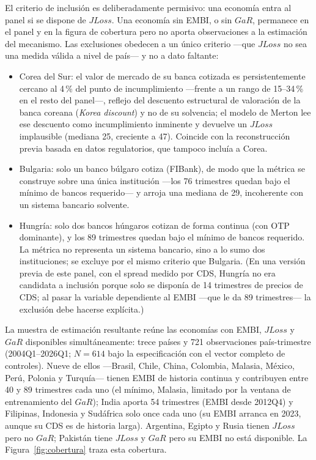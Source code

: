 El criterio de inclusión es deliberadamente permisivo: una economía entra al panel si se dispone de $JLoss$. Una economía sin EMBI, o sin $GaR$, permanece en el panel y en la figura de cobertura pero no aporta observaciones a la estimación del mecanismo. Las exclusiones obedecen a un único criterio —que $JLoss$ no sea una medida válida a nivel de país— y no a dato faltante:

\begin{itemize}
    \item Corea del Sur: el valor de mercado de su banca cotizada es persistentemente cercano al 4\,\% del punto de incumplimiento —frente a un rango de 15--34\,\% en el resto del panel—, reflejo del descuento estructural de valoración de la banca coreana (\textit{Korea discount}) y no de su solvencia; el modelo de Merton lee ese descuento como incumplimiento inminente y devuelve un $JLoss$ implausible (mediana 25, creciente a 47). Coincide con la reconstrucción previa basada en datos regulatorios, que tampoco incluía a Corea.
    \item Bulgaria: solo un banco búlgaro cotiza (FIBank), de modo que la métrica se construye sobre una única institución —los 76 trimestres quedan bajo el mínimo de bancos requerido— y arroja una mediana de 29, incoherente con un sistema bancario solvente.
    \item Hungría: solo dos bancos húngaros cotizan de forma continua (con OTP dominante), y los 89 trimestres quedan bajo el mínimo de bancos requerido. La métrica no representa un sistema bancario, sino a lo sumo dos instituciones; se excluye por el mismo criterio que Bulgaria. (En una versión previa de este panel, con el spread medido por CDS, Hungría no era candidata a inclusión porque solo se disponía de 14 trimestres de precios de CDS; al pasar la variable dependiente al EMBI —que le da 89 trimestres— la exclusión debe hacerse explícita.)
\end{itemize}

La muestra de estimación resultante reúne las economías con EMBI, $JLoss$ y $GaR$ disponibles simultáneamente: trece países y 721 observaciones país-trimestre (2004Q1--2026Q1; $N=614$ bajo la especificación con el vector completo de controles). Nueve de ellos —Brasil, Chile, China, Colombia, Malasia, México, Perú, Polonia y Turquía— tienen EMBI de historia continua y contribuyen entre 40 y 89 trimestres cada uno (el mínimo, Malasia, limitado por la ventana de entrenamiento del $GaR$); India aporta 54 trimestres (EMBI desde 2012Q4) y Filipinas, Indonesia y Sudáfrica solo once cada uno (su EMBI arranca en 2023, aunque su CDS es de historia larga). Argentina, Egipto y Rusia tienen $JLoss$ pero no $GaR$; Pakistán tiene $JLoss$ y $GaR$ pero su EMBI no está disponible. La Figura~\ref{fig:cobertura} traza esta cobertura.

